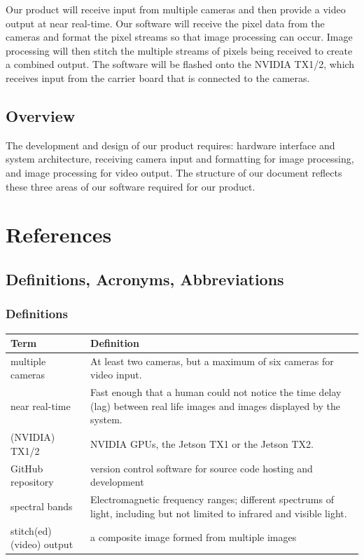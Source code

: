 \documentclass[letterpaper,10pt,serif,draftclsnofoot,onecolumn,compsoc,titlepage]{IEEEtran}
\begin{document}
Our product will receive input from multiple cameras and then provide a video output at 
near real-time. Our software will receive the pixel data from the cameras and format 
the pixel streams so that image processing can occur. Image processing will then stitch 
the multiple streams of pixels being received to create a combined output. The software 
will be flashed onto the NVIDIA TX1/2, which receives input from the carrier 
board that is connected to the cameras. \\

\subsection{Overview}

The development and design of our product requires: hardware interface and system 
architecture, receiving camera input and formatting for image processing, and image 
processing for video output. The structure of our document reflects these three areas 
of our software required for our product. \\ 

\newpage
\section{References}




\subsection{Definitions, Acronyms, Abbreviations}

\subsubsection{Definitions}

\begin{tabular}{|l|p{11cm}|}
	\hline
	\textbf{Term} & \textbf{Definition}\\
	\hline
	multiple cameras & At least two cameras, but a maximum of six cameras for 
	video input.\\
	\hline
	near real-time & Fast enough that a human could not notice the time 
	delay (lag) between \newline real life images and images displayed by the system.\\
	\hline
	(NVIDIA) TX1/2 & NVIDIA GPUs, the Jetson TX1 or the Jetson TX2.\\
	\hline
	GitHub repository & version control software for source code hosting and development\\
	\hline
	spectral bands & Electromagnetic frequency ranges; different 
	spectrums of light, including \newline but not limited to infrared 
	and visible light.\\
	\hline
	stitch(ed) (video) output & a composite image formed from multiple images\\
	\hline
\end{tabular}
\end{document}
